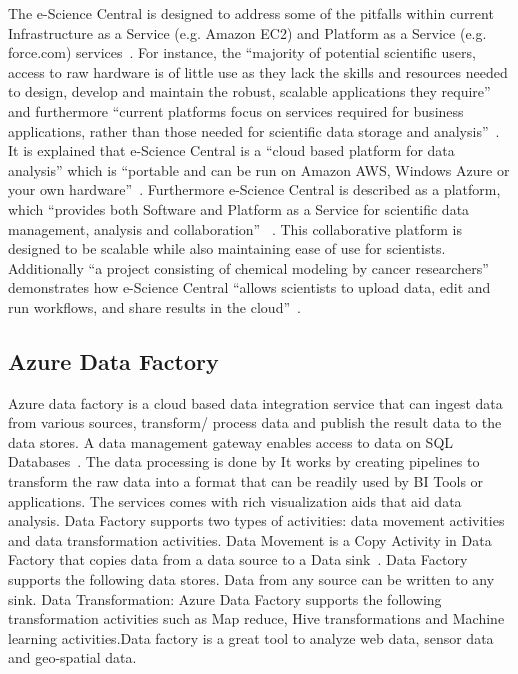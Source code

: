 The e-Science Central is designed to address some of the pitfalls
within current Infrastructure as a Service (e.g.  Amazon EC2) and
Platform as a Service (e.g. force.com)
services~\cite{e-science-central-paper-2010}. For instance, the
``majority of potential scientific users, access to raw hardware is of
little use as they lack the skills and resources needed to design,
develop and maintain the robust, scalable applications they require''
and furthermore ``current platforms focus on services required for
business applications, rather than those needed for scientific data
storage and analysis''~\cite{e-science-central-paper-2010}. It is
explained that e-Science Central is a ``cloud based platform for data
analysis'' which is ``portable and can be run on Amazon AWS, Windows
Azure or your own hardware''~\cite{www-e-science-central}.
Furthermore e-Science Central is described as a platform, which
``provides both Software and Platform as a Service for scientific data
management, analysis and collaboration''
~\cite{e-science-central-paper-2010}. This collaborative platform is
designed to be scalable while also maintaining ease of use for
scientists.  Additionally ``a project consisting of chemical modeling
by cancer researchers'' demonstrates how e-Science Central ``allows
scientists to upload data, edit and run workflows, and share results
in the cloud''~\cite{e-science-central-paper-2010}.

    \pv

\subsection{Azure Data Factory \vc}
    
Azure data factory is a cloud based data integration service that can
ingest data from various sources, transform/ process data and publish
the result data to the data stores. A data management gateway enables
access to data on SQL Databases~\cite{www-jamesserra}. The data
processing is done by It works by creating pipelines to transform the
raw data into a format that can be readily used by BI Tools or
applications. The services comes with rich visualization aids that aid
data analysis. Data Factory supports two types of activities: data
movement activities and data transformation activities. Data Movement
is a Copy Activity in Data Factory that copies data from a data source
to a Data sink~\cite{www-microsoft-azure}. Data Factory supports the
following data stores. Data from any source can be written to any
sink.  Data Transformation: Azure Data Factory supports the following
transformation activities such as Map reduce, Hive transformations and
Machine learning activities.Data factory is a great tool to analyze
web data, sensor data and geo-spatial data.

